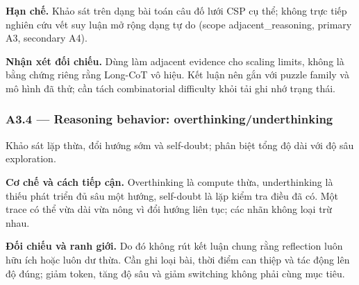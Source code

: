 \noindent\textbf{Hạn chế.} Khảo sát trên dạng bài toán câu đố lưới CSP cụ thể; không trực tiếp nghiên cứu vết suy luận mở rộng dạng tự do (scope adjacent\_reasoning, primary A3, secondary A4).\par
\begin{samepage}
\noindent\textbf{Nhận xét đối chiếu.} Dùng làm adjacent evidence cho scaling limits, không là bằng chứng riêng rằng Long-CoT vô hiệu. Kết luận nên gắn với puzzle family và mô hình đã thử; cần tách combinatorial difficulty khỏi tải ghi nhớ trạng thái.\par
{}
\end{samepage}

\subsubsection*{A3.4 — Reasoning behavior: overthinking/underthinking}
Khảo sát lặp thừa, đổi hướng sớm và self-doubt; phân biệt tổng độ dài với độ sâu exploration.

\noindent\textbf{Cơ chế và cách tiếp cận.} Overthinking là compute thừa, underthinking là thiếu phát triển đủ sâu một hướng, self-doubt là lặp kiểm tra điều đã có. Một trace có thể vừa dài vừa nông vì đổi hướng liên tục; các nhãn không loại trừ nhau.\par
\noindent\textbf{Đối chiếu và ranh giới.} Do đó không rút kết luận chung rằng reflection luôn hữu ích hoặc luôn dư thừa. Cần ghi loại bài, thời điểm can thiệp và tác động lên độ đúng; giảm token, tăng độ sâu và giảm switching không phải cùng mục tiêu.\par

